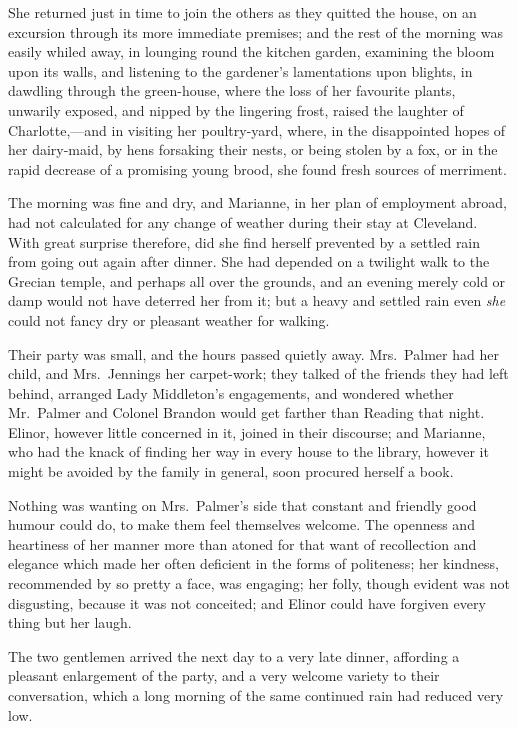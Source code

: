 \documentclass{article}
\begin{document}
She returned just in time to join the others
as they quitted the house, on an excursion through its
more immediate premises; and the rest of the morning was
easily whiled away, in lounging round the kitchen garden,
examining the bloom upon its walls, and listening to the
gardener's lamentations upon blights, in dawdling through
the green-house, where the loss of her favourite plants,
unwarily exposed, and nipped by the lingering frost,
raised the laughter of Charlotte,---and in visiting her
poultry-yard, where, in the disappointed hopes of her
dairy-maid, by hens forsaking their nests, or being
stolen by a fox, or in the rapid decrease of a promising
young brood, she found fresh sources of merriment.

The morning was fine and dry, and Marianne,
in her plan of employment abroad, had not calculated
for any change of weather during their stay at Cleveland.
With great surprise therefore, did she find herself prevented
by a settled rain from going out again after dinner.
She had depended on a twilight walk to the Grecian temple,
and perhaps all over the grounds, and an evening merely
cold or damp would not have deterred her from it;
but a heavy and settled rain even \emph{she} could not fancy dry
or pleasant weather for walking.

Their party was small, and the hours passed quietly away.
Mrs.\ Palmer had her child, and Mrs.\ Jennings her carpet-work;
they talked of the friends they had left behind,
arranged Lady Middleton's engagements, and wondered
whether Mr.\ Palmer and Colonel Brandon would get farther
than Reading that night.  Elinor, however little concerned
in it, joined in their discourse; and Marianne, who had
the knack of finding her way in every house to the library,
however it might be avoided by the family in general,
soon procured herself a book.

Nothing was wanting on Mrs.\ Palmer's side that constant
and friendly good humour could do, to make them feel
themselves welcome.  The openness and heartiness of her
manner more than atoned for that want of recollection
and elegance which made her often deficient in the forms
of politeness; her kindness, recommended by so pretty
a face, was engaging; her folly, though evident
was not disgusting, because it was not conceited;
and Elinor could have forgiven every thing but her laugh.

The two gentlemen arrived the next day to a very
late dinner, affording a pleasant enlargement of the party,
and a very welcome variety to their conversation, which a
long morning of the same continued rain had reduced very low.
\end{document}
